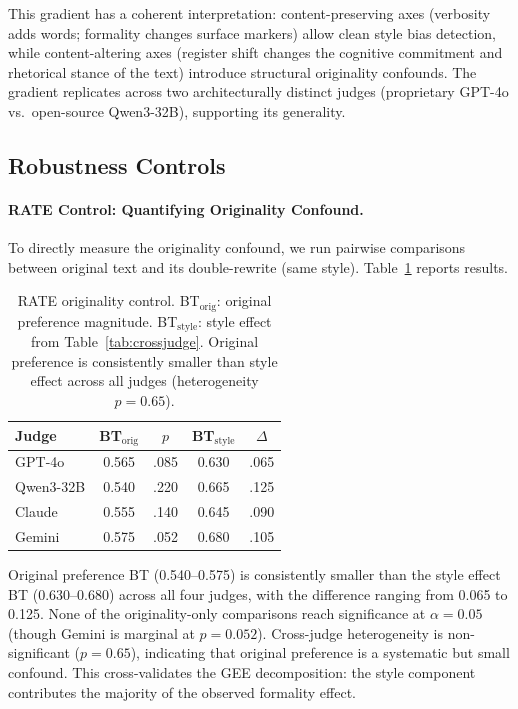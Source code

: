 \documentclass[10pt,twocolumn]{article}
\begin{document}
This gradient has a coherent interpretation: content-preserving axes (verbosity adds words; formality changes surface markers) allow clean style bias detection, while content-altering axes (register shift changes the cognitive commitment and rhetorical stance of the text) introduce structural originality confounds.
The gradient replicates across two architecturally distinct judges (proprietary GPT-4o vs.\ open-source Qwen3-32B), supporting its generality.

\subsection{Robustness Controls}\label{sec:robustness}

\paragraph{RATE Control: Quantifying Originality Confound.}
To directly measure the originality confound, we run pairwise comparisons between original text and its double-rewrite (same style).
Table~\ref{tab:rate} reports results.

\begin{table}[t]
\centering
\caption{RATE originality control. BT$_{\text{orig}}$: original preference magnitude. BT$_{\text{style}}$: style effect from Table~\ref{tab:crossjudge}. Original preference is consistently smaller than style effect across all judges (heterogeneity $p=0.65$).}
\label{tab:rate}
\small
\begin{tabular}{@{}lcccc@{}}
\toprule
Judge & BT$_\text{orig}$ & $p$ & BT$_\text{style}$ & $\Delta$ \\
\midrule
GPT-4o & 0.565 & .085 & 0.630 & .065 \\
Qwen3-32B & 0.540 & .220 & 0.665 & .125 \\
Claude & 0.555 & .140 & 0.645 & .090 \\
Gemini & 0.575 & .052 & 0.680 & .105 \\
\bottomrule
\end{tabular}
\end{table}

Original preference BT (0.540--0.575) is consistently smaller than the style effect BT (0.630--0.680) across all four judges, with the difference ranging from 0.065 to 0.125.
None of the originality-only comparisons reach significance at $\alpha=0.05$ (though Gemini is marginal at $p=0.052$).
Cross-judge heterogeneity is non-significant ($p=0.65$), indicating that original preference is a systematic but small confound.
This cross-validates the GEE decomposition: the style component contributes the majority of the observed formality effect.
\end{document}
